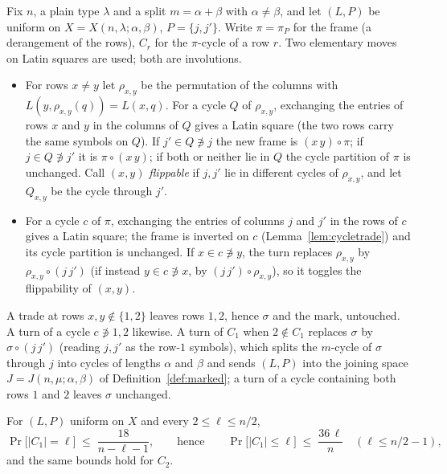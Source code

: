 Fix $n$, a plain type $\lambda$ and a split $m=\alpha+\beta$ with
$\alpha\ne\beta$, and let $(L,P)$ be uniform on
$X=X(n,\lambda;\alpha,\beta)$, $P=\{j,j'\}$.  Write $\pi=\pi_P$ for
the frame (a derangement of the rows), $C_r$ for the $\pi$-cycle of a
row $r$.  Two elementary moves on Latin squares are used; both are
involutions.
\begin{itemize}[leftmargin=2em]
\item[(\textsc{trade})] For rows $x\ne y$ let $\rho_{x,y}$ be the
permutation of the columns with $L(y,\rho_{x,y}(q))=L(x,q)$.  For a
cycle $Q$ of $\rho_{x,y}$, exchanging the entries of rows $x$ and $y$
in the columns of $Q$ gives a Latin square (the two rows carry the
same symbols on $Q$).  If $j'\in Q\not\ni j$ the new frame is
$(x\,y)\circ\pi$; if $j\in Q\not\ni j'$ it is $\pi\circ(x\,y)$; if
both or neither lie in $Q$ the cycle partition of $\pi$ is unchanged.
Call $(x,y)$ \emph{flippable} if $j,j'$ lie in different cycles of
$\rho_{x,y}$, and let $Q_{x,y}$ be the cycle through $j'$.
\item[(\textsc{turn})] For a cycle $c$ of $\pi$, exchanging the
entries of columns $j$ and $j'$ in the rows of $c$ gives a Latin
square; the frame is inverted on $c$ (Lemma~\ref{lem:cycletrade}) and
its cycle partition is unchanged.  If $x\in c\not\ni y$, the turn
replaces $\rho_{x,y}$ by $\rho_{x,y}\circ(j\,j')$ (if instead
$y\in c\not\ni x$, by $(j\,j')\circ\rho_{x,y}$), so it toggles the
flippability of $(x,y)$.
\end{itemize}
A trade at rows $x,y\notin\{1,2\}$ leaves rows $1,2$, hence $\sigma$
and the mark, untouched.  A turn of a cycle $c\not\ni1,2$ likewise.
A turn of $C_1$ when $2\notin C_1$ replaces $\sigma$ by
$\sigma\circ(j\,j')$ (reading $j,j'$ as the row-$1$ symbols), which
splits the $m$-cycle of $\sigma$ through $j$ into cycles of lengths
$\alpha$ and $\beta$ and sends $(L,P)$ into the joining space
$J=J(n,\mu;\alpha,\beta)$ of Definition~\ref{def:marked}; a turn of a
cycle containing both rows $1$ and $2$ leaves $\sigma$ unchanged.

\begin{proposition}
\label{prop:trapped}
For $(L,P)$ uniform on $X$ and every $2\le\ell\le n/2$,
\[
\Pr\bigl[|C_1|=\ell\bigr]\;\le\;\frac{18}{n-\ell-1},
\qquad\text{hence}\qquad
\Pr\bigl[|C_1|\le \ell\bigr]\;\le\;\frac{36\,\ell}{n}\quad(\ell\le n/2-1),
\]
and the same bounds hold for $C_2$.
\end{proposition}


